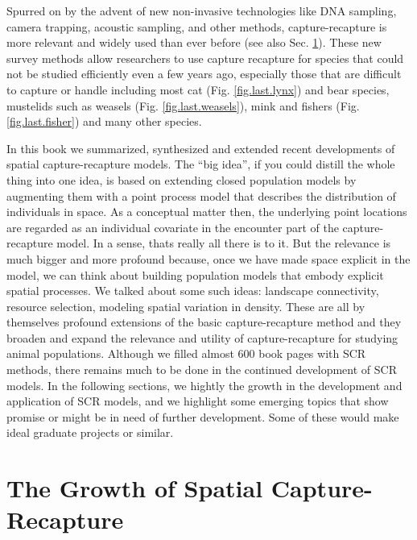 Spurred on by the advent of new non-invasive technologies like DNA
sampling, camera trapping, acoustic sampling, and other methods,
capture-recapture is more relevant and widely used than ever before
(see also Sec. \ref{last.sec.growth}).  These new survey methods allow
researchers to use capture recapture for species that could not be
studied efficiently even a few years ago, especially those that are
difficult to capture or handle including most cat
(Fig. \ref{fig.last.lynx})
and bear
species, mustelids such as weasels (Fig. \ref{fig.last.weasels}), 
mink and fishers (Fig. \ref{fig.last.fisher}) and many other species. 


In this book we summarized, synthesized and extended recent
developments of spatial capture-recapture models.  The ``big idea'',
if you could distill the whole thing into one idea, is based on
extending closed population models by augmenting them with a point
process model that describes the distribution of individuals
\citep{efford:2004} in space. As a conceptual matter then, the
underlying point locations are regarded as an individual covariate in
the encounter part of the capture-recapture model. In a sense, thats
really all there is to it. But the relevance is much bigger and more
profound because, once we have made space explicit in the model, 
we can think about building population models that embody explicit
spatial processes. 
We talked about some such ideas: landscape connectivity, resource
selection, modeling spatial variation in density. These are all by
themselves profound extensions of the basic capture-recapture method
and they broaden and expand the relevance and utility of
capture-recapture for studying animal populations.
Although we filled almost 600 book pages with SCR methods,
there remains much to be done in the continued development of SCR
models. In the following sections, we hightly the growth in the
development and application of SCR models, and 
we highlight  some emerging topics that show promise or might be in
need of further development. Some of these would make ideal
graduate projects or similar.


\section{The Growth of Spatial Capture-Recapture}
\label{last.sec.growth}

